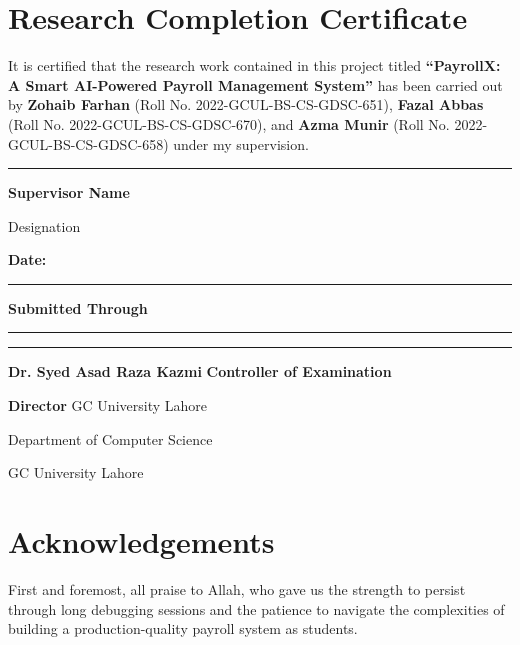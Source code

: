 \documentclass[12pt,a4paper]{report}
\begin{document}
\chapter*{Research Completion Certificate}

It is certified that the research work contained in this project titled \textbf{``PayrollX: A Smart AI-Powered Payroll Management System''} has been carried out by \textbf{Zohaib Farhan} (Roll No. 2022-GCUL-BS-CS-GDSC-651), \textbf{Fazal Abbas} (Roll No. 2022-GCUL-BS-CS-GDSC-670), and \textbf{Azma Munir} (Roll No. 2022-GCUL-BS-CS-GDSC-658) under my supervision.

\vspace{3cm}

\hfill\rule{5cm}{0.4pt}

\hfill\textbf{Supervisor Name}

\hfill Designation

\vspace{2cm}

\noindent\textbf{Date:} \rule{3cm}{0.4pt}

\vspace{2cm}

\noindent\textbf{Submitted Through}

\vspace{2cm}

\noindent\rule{5cm}{0.4pt} \hfill \rule{5cm}{0.4pt}

\noindent\textbf{Dr. Syed Asad Raza Kazmi} \hfill \textbf{Controller of Examination}

\noindent\textbf{Director} \hfill GC University Lahore

\noindent Department of Computer Science

\noindent GC University Lahore

\chapter*{Acknowledgements}

First and foremost, all praise to Allah, who gave us the strength to persist through long debugging sessions and the patience to navigate the complexities of building a production-quality payroll system as students.
\end{document}
